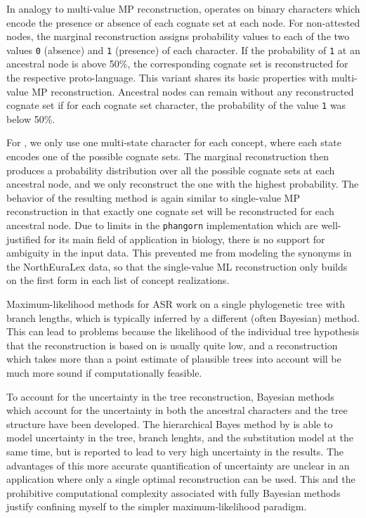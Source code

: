 In analogy to multi-value MP reconstruction, \textit{} operates on binary characters which encode the presence or absence of each cognate set at each node. For non-attested nodes, the marginal reconstruction assigns probability values to each of the two values \texttt{0} (absence) and \texttt{1} (presence) of each character. If the probability of \texttt{1} at an ancestral node is above 50\%, the corresponding cognate set is reconstructed for the respective proto-language. This variant shares its basic properties with multi-value MP reconstruction. Ancestral nodes can remain without any reconstructed cognate set if for each cognate set character, the probability of the value \texttt{1} was below 50\%.

For \textit{}, we only use one multi-state character for each concept, where each state encodes one of the possible cognate sets. The marginal reconstruction then produces a probability distribution over all the possible cognate sets at each ancestral node, and we only reconstruct the one with the highest probability. The behavior of the resulting method is again similar to single-value MP reconstruction in that exactly one cognate set will be reconstructed for each ancestral node. Due to limits in the \texttt{phangorn} implementation which are well-justified for its main field of application in biology, there is no support for ambiguity in the input data. This prevented me from modeling the synonyms in the NorthEuraLex data, so that the single-value ML reconstruction only builds on the first form in each list of concept realizations.

Maximum-likelihood methods for ASR work on a single phylogenetic tree with branch lengths, which is typically inferred by a different (often Bayesian) method. This can lead to problems because the likelihood of the individual tree hypothesis that the reconstruction is based on is usually quite low, and a reconstruction which takes more than a point estimate of plausible trees into account will be much more sound if computationally feasible.

To account for the uncertainty in the tree reconstruction, Bayesian methods which account for the uncertainty in both the ancestral characters and the tree structure have been developed. The hierarchical Bayes method by \cite{huelsenbeck_bollback_2001} is able to model uncertainty in the tree, branch lenghts, and the substitution model at the same time, but is reported to lead to very high uncertainty in the results. The advantages of this more accurate quantification of uncertainty are unclear in an application where only a single optimal reconstruction can be used. This and the prohibitive computational complexity associated with fully Bayesian methods justify confining myself to the simpler maximum-likelihood paradigm.

